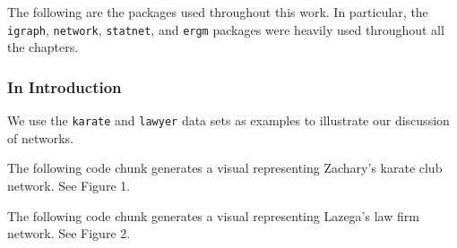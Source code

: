 \documentclass[12pt,twoside]{amherstthesis}
\begin{document}
  The following are the packages used throughout this work. In particular,
  the \texttt{igraph}, \texttt{network}, \texttt{statnet}, and
  \texttt{ergm} packages were heavily used throughout all the chapters.
  
  \begin{Shaded}
  \begin{Highlighting}[]
  
  \NormalTok{(} \NormalTok{)}
  \NormalTok{(} \NormalTok{)}
  \end{Highlighting}
  \end{Shaded}
  
  \subsubsection{In Introduction}\label{in-introduction}
  
  We use the \texttt{karate} and \texttt{lawyer} data sets as examples to
  illustrate our discussion of networks.
  
  \begin{Shaded}
  \begin{Highlighting}[]
  \end{Highlighting}
  \end{Shaded}
  
  The following code chunk generates a visual representing Zachary's
  karate club network. See Figure 1.
  
  \begin{Shaded}
  \begin{Highlighting}[]
  \end{Highlighting}
  \end{Shaded}
  
  The following code chunk generates a visual representing Lazega's law
  firm network. See Figure 2.
  
\end{document}
